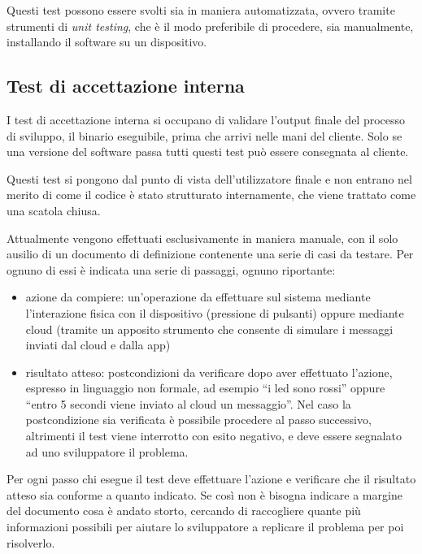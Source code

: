 \documentclass[12pt,a4paper,twoside,titlepage]{book}
\begin{document}
Questi test possono essere svolti sia in maniera automatizzata, ovvero tramite strumenti di 
\textit{unit testing}, che è il modo preferibile di procedere, sia manualmente, installando 
il software su un dispositivo. 

\subsection{Test di accettazione interna}
\label{subsection:test_accettazione_interna}

I test di accettazione interna si occupano di validare l'output finale del processo di sviluppo, 
il binario eseguibile, prima che arrivi nelle mani del cliente.  
Solo se una versione del software passa tutti questi test può essere consegnata al cliente.

Questi test si pongono dal punto di vista dell'utilizzatore finale e non entrano nel merito di come 
il codice è stato strutturato internamente, che viene trattato come una scatola chiusa. 

Attualmente vengono effettuati esclusivamente in maniera manuale, con il solo ausilio di un documento
di definizione contenente una serie di casi da testare. Per ognuno di essi è indicata una serie di 
passaggi, ognuno riportante:

\begin{itemize}
    \item azione da compiere: un'operazione da effettuare sul sistema mediante l'interazione fisica
        con il dispositivo (pressione di pulsanti) oppure mediante cloud (tramite un apposito
        strumento che consente di simulare i messaggi inviati dal cloud e dalla app)
    \item risultato atteso: postcondizioni da verificare dopo aver effettuato l'azione, espresso in
        linguaggio non formale, ad esempio ``i \acrshort{led} sono rossi'' oppure ``entro 5 secondi viene inviato al cloud un messaggio''.
        Nel caso la postcondizione sia verificata è possibile procedere al passo successivo, altrimenti
        il test viene interrotto con esito negativo, e deve essere segnalato ad uno sviluppatore il problema.
\end{itemize}

Per ogni passo chi esegue il test deve effettuare l'azione e verificare che il risultato atteso sia 
conforme a quanto indicato. Se così non è bisogna indicare a margine del documento cosa è andato 
storto, cercando di raccogliere quante più informazioni possibili per aiutare lo sviluppatore a replicare 
il problema per poi risolverlo. 
\end{document}
